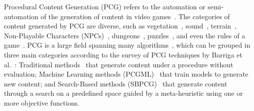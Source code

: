 Procedural Content Generation (PCG) refers to the automation or semi-automation of the generation of content in video games~\cite{hendrikx2013procedural}. The categories of content generated by PCG are diverse, such as vegetation~\cite{mora2021flora}, sound~\cite{plans2012experience}, terrain~\cite{frade2009breeding}, Non-Playable Characters (NPCs)~\cite{viana2022illuminating}, dungeons~\cite{viana2019survey}, puzzles~\cite{de2019procedural}, and even the rules of a game~\cite{browne2008automatic}. PCG is a large field spanning many algorithms~\cite{yannakakis2018artificial}, which can be grouped in three main categories according to the survey of PCG techniques by Barriga et al.~\cite{Barriga2019}: Traditional methods~\cite{freiknecht2017survey} that generate content under a procedure without evaluation; Machine Learning methods (PCGML)~\cite{Summerville2018,liu2021deep,souchleris2023reinforcement} that train models to generate new content; and Search-Based methods (SBPCG)~\cite{hendrikx2013procedural,togelius2011search} that generate content through a search on a predefined space guided by a meta-heuristic using one or more objective functions. 


